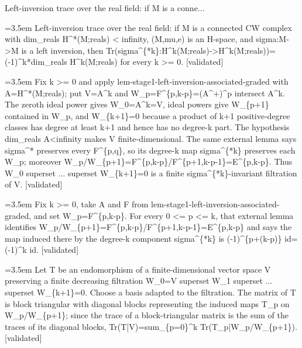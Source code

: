 \documentclass{article}
\newcommand{\step}[1]{\par\noindent\hangindent=3.5em\hangafter=1%
  \makebox[3.5em][l]{\textbf{#1.}}}
\newcommand{\steptag}[1]{\hfill{\small\textsf{[#1]}}}
\begin{document}
\begin{proofbox}{Left-inversion trace over the real field: if M is a conne...}
\step{1} Left-inversion trace over the real field: if M is a connected CW complex with dim\_reals H\textasciicircum{}*(M;reals) < infinity, (M,mu,e) is an H-space, and sigma:M->M is a left inversion, then Tr(sigma\textasciicircum{}\{*k\}:H\textasciicircum{}k(M;reals)->H\textasciicircum{}k(M;reals))=(-1)\textasciicircum{}k*dim\_reals H\textasciicircum{}k(M;reals) for every k >= 0. \steptag{validated} \\[6pt]
\step{1.1} Fix k >= 0 and apply lem-stage1-left-inversion-associated-graded with A=H\textasciicircum{}*(M;reals); put V=A\textasciicircum{}k and W\_p=F\textasciicircum{}\{p,k-p\}=(A\textasciicircum{}+)\textasciicircum{}p intersect A\textasciicircum{}k. The zeroth ideal power gives W\_0=A\textasciicircum{}k=V, ideal powers give W\_\{p+1\} contained in W\_p, and W\_\{k+1\}=0 because a product of k+1 positive-degree classes has degree at least k+1 and hence has no degree-k part. The hypothesis dim\_reals A<infinity makes V finite-dimensional. The same external lemma says sigma\textasciicircum{}* preserves every F\textasciicircum{}\{p,q\}, so its degree-k map sigma\textasciicircum{}\{*k\} preserves each W\_p; moreover W\_p/W\_\{p+1\}=F\textasciicircum{}\{p,k-p\}/F\textasciicircum{}\{p+1,k-p-1\}=E\textasciicircum{}\{p,k-p\}. Thus W\_0 superset ... superset W\_\{k+1\}=0 is a finite sigma\textasciicircum{}\{*k\}-invariant filtration of V. \steptag{validated} \\[4pt]
\step{1.2} Fix k >= 0, take A and F from lem-stage1-left-inversion-associated-graded, and set W\_p=F\textasciicircum{}\{p,k-p\}. For every 0 <= p <= k, that external lemma identifies W\_p/W\_\{p+1\}=F\textasciicircum{}\{p,k-p\}/F\textasciicircum{}\{p+1,k-p-1\}=E\textasciicircum{}\{p,k-p\} and says the map induced there by the degree-k component sigma\textasciicircum{}\{*k\} is (-1)\textasciicircum{}\{p+(k-p)\} id=(-1)\textasciicircum{}k id. \steptag{validated} \\[4pt]
\step{1.3} Let T be an endomorphism of a finite-dimensional vector space V preserving a finite decreasing filtration W\_0=V superset W\_1 superset ... superset W\_\{k+1\}=0. Choose a basis adapted to the filtration. The matrix of T is block triangular with diagonal blocks representing the induced maps T\_p on W\_p/W\_\{p+1\}; since the trace of a block-triangular matrix is the sum of the traces of its diagonal blocks, Tr(T|V)=sum\_\{p=0\}\textasciicircum{}k Tr(T\_p|W\_p/W\_\{p+1\}). \steptag{validated} \\[4pt]

\end{proofbox}
\end{document}
